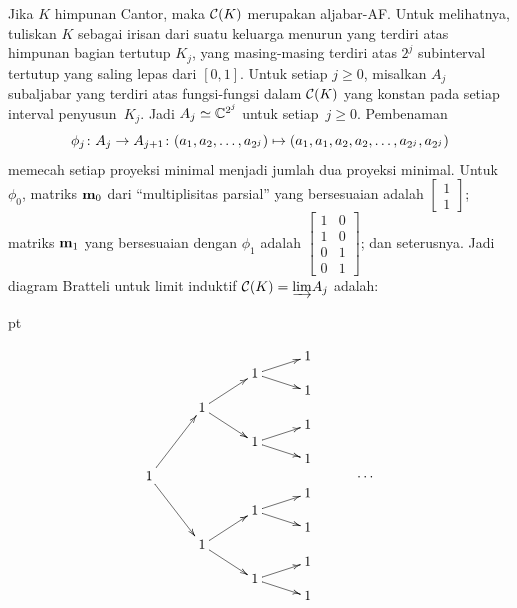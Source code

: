 \begin{exam} Jika $K$ himpunan Cantor, maka $\mathcal{C}(K)$ merupakan aljabar-AF.
Untuk melihatnya, tuliskan $K$ sebagai irisan dari suatu keluarga menurun yang terdiri atas himpunan bagian tertutup $K_j$, yang masing-masing
terdiri atas $2^j$ subinterval tertutup yang saling lepas dari $[0,1]$. Untuk setiap $j \ge 0$, misalkan
$A_j$ subaljabar yang terdiri atas fungsi-fungsi dalam $\mathcal{C}(K)$ yang konstan pada setiap
interval penyusun~$K_j$. Jadi $A_j \simeq \mathbb{C}^{2^j}$ untuk setiap~$j \ge 0$. Pembenaman
 \[\phi_j \colon A_j \rightarrow A_{j+1}\colon
      (a_1, a_2, \dots, a_{2^j}) \mapsto
        (a_1, a_1, a_2, a_2,\dots, a_{2^j}, a_{2^j})\]
memecah setiap proyeksi minimal menjadi jumlah dua proyeksi minimal. Untuk $\phi_0$, matriks
$\mathbf{m}_0$ dari ``multiplisitas parsial'' yang bersesuaian adalah $\begin{bmatrix} 1 \\ 1
\end{bmatrix}$; matriks $\mathbf{m}_1$ yang bersesuaian dengan $\phi_1$ adalah
$\begin{bmatrix} 1 & 0\\ 1 & 0 \\ 0 & 1 \\ 0 & 1 \end{bmatrix}$; dan seterusnya. Jadi diagram Bratteli
untuk limit induktif $\mathcal{C}(K) = \underrightarrow{\lim}A_j$ adalah:

 pt

 \[\xymatrix@=+7pt@C+20pt@R-7pt{
     &&& 1 & \\
     && 1\ar[ur]\ar[dr] && \\
     &&& 1 & \\
     & 1\ar[uur]\ar[ddr] &&& \\
     &&& 1 & \\
     && 1\ar[ur]\ar[dr] && \\
     &&& 1 & \\
     1\ar[uuuur]\ar[ddddr] &&&& \cdots \\
     &&& 1 & \\
     && 1\ar[ur]\ar[dr] && \\
     &&& 1 & \\
     & 1\ar[uur]\ar[ddr] &&& \\
     &&&1 & \\
     && 1\ar[ur]\ar[dr] && \\
     &&& 1 &
   }\]
\end{exam}

